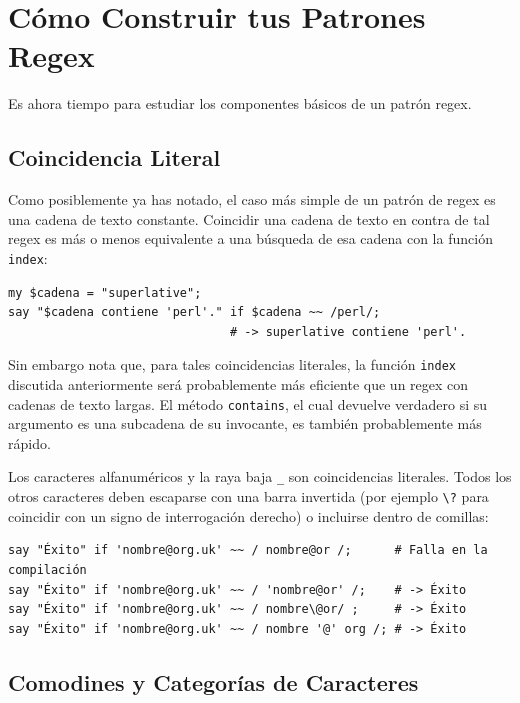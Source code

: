 \section{Cómo Construir tus Patrones Regex}
\label{pattern}

Es ahora tiempo para estudiar los componentes básicos de 
un patrón regex.

\subsection{Coincidencia Literal}

Como posiblemente ya has notado, el caso más simple de un
patrón de regex es una cadena de texto constante. Coincidir
una cadena de texto en contra de tal regex es más o menos 
equivalente a una búsqueda de esa cadena con la función 
{\tt index}:

\begin{lstlisting}
my $cadena = "superlative";
say "$cadena contiene 'perl'." if $cadena ~~ /perl/;
                               # -> superlative contiene 'perl'.
\end{lstlisting}
%

Sin embargo nota que, para tales coincidencias literales, 
la función {\tt index} discutida anteriormente será probablemente
más eficiente que un regex con cadenas de texto largas. 
El método {\tt contains}, el cual devuelve verdadero si su
argumento es una subcadena de su invocante, es también probablemente
más rápido.

Los caracteres alfanuméricos y la raya baja \verb|_| son coincidencias
literales. Todos los otros caracteres deben escaparse con una barra
invertida (por ejemplo \verb|\?| para coincidir con un signo de interrogación
derecho) o incluirse dentro de comillas:

\begin{lstlisting}
say "Éxito" if 'nombre@org.uk' ~~ / nombre@or /;      # Falla en la compilación
say "Éxito" if 'nombre@org.uk' ~~ / 'nombre@or' /;    # -> Éxito
say "Éxito" if 'nombre@org.uk' ~~ / nombre\@or/ ;     # -> Éxito
say "Éxito" if 'nombre@org.uk' ~~ / nombre '@' org /; # -> Éxito
\end{lstlisting}
%


\subsection{Comodines y Categorías de Caracteres}


